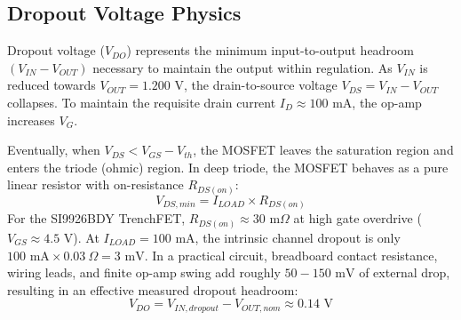 \documentclass[11pt,a4paper]{article}
\begin{document}
\subsection{Dropout Voltage Physics}
Dropout voltage ($V_{DO}$) represents the minimum input-to-output headroom $(V_{IN} - V_{OUT})$ necessary to maintain the output within regulation. As $V_{IN}$ is reduced towards $V_{OUT} = 1.200\text{ V}$, the drain-to-source voltage $V_{DS} = V_{IN} - V_{OUT}$ collapses. To maintain the requisite drain current $I_D \approx 100\text{ mA}$, the op-amp increases $V_G$. 

Eventually, when $V_{DS} < V_{GS} - V_{th}$, the MOSFET leaves the saturation region and enters the triode (ohmic) region. In deep triode, the MOSFET behaves as a pure linear resistor with on-resistance $R_{DS(on)}$:
\begin{equation}
    V_{DS,min} = I_{LOAD} \times R_{DS(on)}
\end{equation}
For the SI9926BDY TrenchFET, $R_{DS(on)} \approx 30\text{ m}\Omega$ at high gate overdrive ($V_{GS} \approx 4.5\text{ V}$). At $I_{LOAD} = 100\text{ mA}$, the intrinsic channel dropout is only $100\text{ mA} \times 0.03\ \Omega = 3\text{ mV}$. In a practical circuit, breadboard contact resistance, wiring leads, and finite op-amp swing add roughly $50 - 150\text{ mV}$ of external drop, resulting in an effective measured dropout headroom:
\begin{equation}
    V_{DO} = V_{IN,dropout} - V_{OUT,nom} \approx 0.14\text{ V}
\end{equation}
\end{document}
